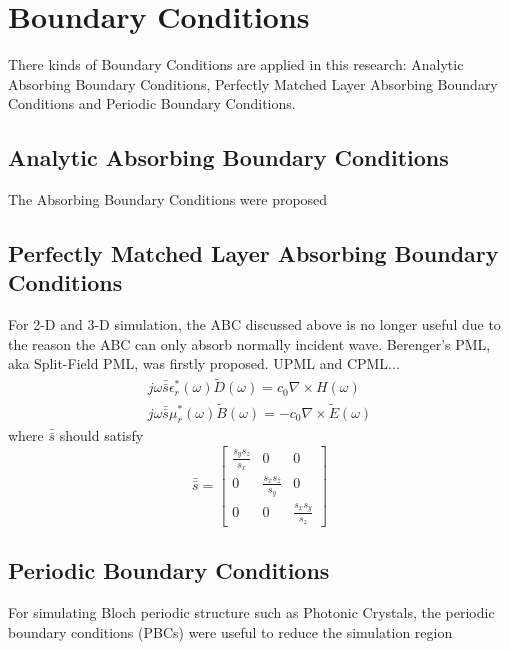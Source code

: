 \section{Boundary Conditions}
\label{sec:bcs}
There kinds of Boundary Conditions are applied in this research: Analytic Absorbing Boundary Conditions, Perfectly
Matched Layer Absorbing Boundary Conditions and Periodic Boundary Conditions.
\subsection{Analytic Absorbing Boundary Conditions}

The Absorbing Boundary Conditions were proposed

\subsection{Perfectly Matched Layer Absorbing Boundary Conditions}
\label{subsec:pml}
For 2-D and 3-D simulation, the ABC discussed above is no longer useful due to the reason the ABC can only absorb
normally incident wave. Berenger's PML, aka Split-Field PML, was firstly proposed. UPML and CPML...
\begin{gather}
  j\omega\bar{\bar{s}}\epsilon_r^*(\omega)\widetilde{D}(\omega) = c_0\nabla\times H(\omega)\\
  j\omega\bar{\bar{s}}\mu_r^*(\omega)\widetilde{B}(\omega) = -c_0\nabla\times\widetilde{E}(\omega)
\end{gather}
where $\bar{\bar{s}}$ should satisfy
\begin{equation}
  \bar{\bar{s}} = 
  \begin{bmatrix}
    \displaystyle\frac{s_ys_z}{s_x}& 0& 0\\
    0& \displaystyle\frac{s_xs_z}{s_y}& 0\\
    0& 0& \displaystyle\frac{s_xs_y}{s_z}
  \end{bmatrix}
\end{equation}


\subsection{Periodic Boundary Conditions}

For simulating Bloch periodic structure such as Photonic Crystals, the periodic boundary conditions (PBCs) were useful
to reduce the simulation region
